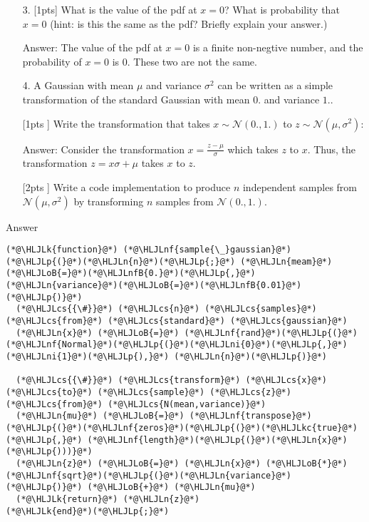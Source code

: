 \documentclass[12pt,a4paper]{article}
\newcommand{\HLJLk}[1]{\textcolor[RGB]{148,91,176}{\textbf{#1}}}
\newcommand{\HLJLkc}[1]{\textcolor[RGB]{59,151,46}{\textit{#1}}}
\newcommand{\HLJLn}[1]{#1}
\newcommand{\HLJLnf}[1]{\textcolor[RGB]{66,102,213}{#1}}
\newcommand{\HLJLnfB}[1]{\textcolor[RGB]{59,151,46}{#1}}
\newcommand{\HLJLni}[1]{\textcolor[RGB]{59,151,46}{#1}}
\newcommand{\HLJLoB}[1]{\textcolor[RGB]{102,102,102}{\textbf{#1}}}
\newcommand{\HLJLp}[1]{#1}
\newcommand{\HLJLcs}[1]{\textcolor[RGB]{153,153,119}{\textit{#1}}}
\begin{document}
\begin{itemize}
\item[3. ] [1pts] What is the value of the pdf at $x=0$? What is probability that $x=0$ (hint: is this the same as the pdf? Briefly explain your answer.)

Answer: The value of the pdf at $x=0$ is a finite non-negtive number, and the probability of $x=0$ is 0. These two are not the same.


\item[4. ] A Gaussian with mean $\mu$ and variance $\sigma^2$ can be written as a simple transformation of the standard Gaussian with mean $0.$ and variance $1.$.

\end{itemize}
\begin{itemize}
\item [[1pts]] Write the transformation that takes $x \sim \mathcal{N}(0.,1.)$ to $z \sim \mathcal{N}(\mu, \sigma^2)$:

Answer: Consider the transformation $x = \frac{z - \mu}{\sigma}$ which takes $z$ to $x$. Thus, the transformation $z = x\sigma + \mu$ takes $x$ to $z$.


\item [[2pts]] Write a code implementation to produce $n$ independent samples from $\mathcal{N}(\mu, \sigma^2)$ by transforming $n$ samples from $\mathcal{N}(0.,1.)$.

\end{itemize}
Answer


\begin{lstlisting}
(*@\HLJLk{function}@*) (*@\HLJLnf{sample{\_}gaussian}@*)(*@\HLJLp{(}@*)(*@\HLJLn{n}@*)(*@\HLJLp{;}@*) (*@\HLJLn{meam}@*)(*@\HLJLoB{=}@*)(*@\HLJLnfB{0.}@*)(*@\HLJLp{,}@*) (*@\HLJLn{variance}@*)(*@\HLJLoB{=}@*)(*@\HLJLnfB{0.01}@*)(*@\HLJLp{)}@*)
  (*@\HLJLcs{{\#}}@*) (*@\HLJLcs{n}@*) (*@\HLJLcs{samples}@*) (*@\HLJLcs{from}@*) (*@\HLJLcs{standard}@*) (*@\HLJLcs{gaussian}@*)
  (*@\HLJLn{x}@*) (*@\HLJLoB{=}@*) (*@\HLJLnf{rand}@*)(*@\HLJLp{(}@*)(*@\HLJLnf{Normal}@*)(*@\HLJLp{(}@*)(*@\HLJLni{0}@*)(*@\HLJLp{,}@*) (*@\HLJLni{1}@*)(*@\HLJLp{),}@*) (*@\HLJLn{n}@*)(*@\HLJLp{)}@*)

  (*@\HLJLcs{{\#}}@*) (*@\HLJLcs{transform}@*) (*@\HLJLcs{x}@*) (*@\HLJLcs{to}@*) (*@\HLJLcs{sample}@*) (*@\HLJLcs{z}@*) (*@\HLJLcs{from}@*) (*@\HLJLcs{N(mean,variance)}@*)
  (*@\HLJLn{mu}@*) (*@\HLJLoB{=}@*) (*@\HLJLnf{transpose}@*)(*@\HLJLp{(}@*)(*@\HLJLnf{zeros}@*)(*@\HLJLp{(}@*)(*@\HLJLkc{true}@*)(*@\HLJLp{,}@*) (*@\HLJLnf{length}@*)(*@\HLJLp{(}@*)(*@\HLJLn{x}@*)(*@\HLJLp{)))}@*)
  (*@\HLJLn{z}@*) (*@\HLJLoB{=}@*) (*@\HLJLn{x}@*) (*@\HLJLoB{*}@*) (*@\HLJLnf{sqrt}@*)(*@\HLJLp{(}@*)(*@\HLJLn{variance}@*)(*@\HLJLp{)}@*) (*@\HLJLoB{+}@*) (*@\HLJLn{mu}@*)
  (*@\HLJLk{return}@*) (*@\HLJLn{z}@*)
(*@\HLJLk{end}@*)(*@\HLJLp{;}@*)
\end{lstlisting}
\end{document}
